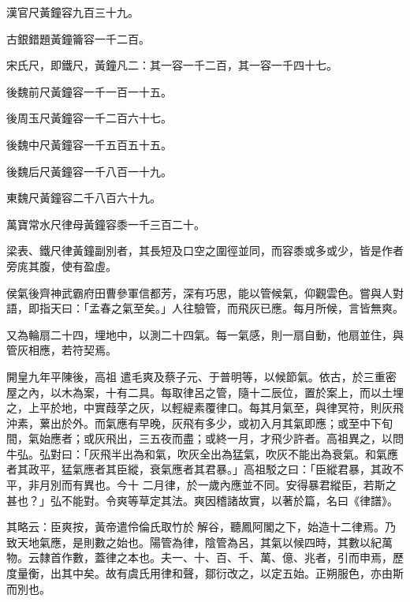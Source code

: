 \begin{pinyinscope}
 漢官尺黃鐘容九百三十九。



 古銀錯題黃鐘籥容一千二百。



 宋氏尺，即鐵尺，黃鐘凡二：其一容一千二百，其一容一千四十七。



 後魏前尺黃鐘容一千一百一十五。



 後周玉尺黃鐘容一千二百六十七。



 後魏中尺黃鐘容一千五百五十五。



 後魏后尺黃鐘容一千八百一十九。



 東魏尺黃鐘容二千八百六十九。



 萬寶常水尺律母黃鐘容黍一千三百二十。



 梁表、鐵尺律黃鐘副別者，其長短及口空之圍徑並同，而容黍或多或少，皆是作者旁庣其腹，使有盈虛。



 侯氣後齊神武霸府田曹參軍信都芳，深有巧思，能以管候氣，仰觀雲色。嘗與人對語，即指天曰：「孟春之氣至矣。」人往驗管，而飛灰已應。每月所候，言皆無爽。



 又為輪扇二十四，埋地中，以測二十四氣。每一氣感，則一扇自動，他扇並住，與管灰相應，若符契焉。



 開皇九年平陳後，高祖
 遣毛爽及蔡子元、于普明等，以候節氣。依古，於三重密屋之內，以木為案，十有二具。每取律呂之管，隨十二辰位，置於案上，而以土埋之，上平於地，中實葭莩之灰，以輕緹素覆律口。每其月氣至，與律冥符，則灰飛沖素，蔂出於外。而氣應有早晚，灰飛有多少，或初入月其氣即應；或至中下旬間，氣始應者；或灰飛出，三五夜而盡；或終一月，才飛少許者。高祖異之，以問牛弘。弘對曰：「灰飛半出為和氣，吹灰全出為猛氣，吹灰不能出為衰氣。和氣應者其政平，猛氣應者其臣縱，衰氣應者其君暴。」高祖駁之曰：「臣縱君暴，其政不平，非月別而有異也。今十
 二月律，於一歲內應並不同。安得暴君縱臣，若斯之甚也？」弘不能對。令爽等草定其法。爽因稽諸故實，以著於篇，名曰《律譜》。



 其略云：臣爽按，黃帝遣伶倫氏取竹於解谷，聽鳳阿閣之下，始造十二律焉。乃致天地氣應，是則數之始也。陽管為律，陰管為呂，其氣以候四時，其數以紀萬物。云隸首作數，蓋律之本也。夫一、十、百、千、萬、億、兆者，引而申焉，歷度量衡，出其中矣。故有虞氏用律和聲，鄒衍改之，以定五始。正朔服色，亦由斯而別也。




\end{pinyinscope}
